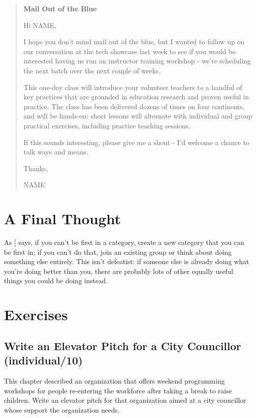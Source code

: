 \begin{quote}\setlength{\parindent}{0pt}
\textbf{Mail Out of the Blue}

Hi NAME,

I hope you don't mind mail out of the blue, but I wanted to follow up
on our conversation at the tech showcase last week to see if you would
be interested having us run an instructor training workshop - we're
scheduling the next batch over the next couple of weeks.

This one-day class will introduce your volunteer teachers to a handful
of key practices that are grounded in education research and proven
useful in practice. The class has been delivered dozens of times on
four continents, and will be hands-on: short lessons will alternate
with individual and group practical exercises, including practice
teaching sessions.

If this sounds interesting, please give me a shout - I'd welcome a
chance to talk ways and means.

Thanks,

NAME
\end{quote}

\section{A Final Thought}\label{s:marketing-final}

As {[}\protect[\hyperlink{b:Kuch2011}{Kuch2011}]{]} says, if you can't be first in a category, create
a new category that you can be first in; if you can't do that, join an
existing group or think about doing something else entirely. This isn't
defeatist: if someone else is already doing what you're doing better
than you, there are probably lots of other equally useful things you
could be doing instead.

\section{Exercises}\label{s:marketing-exercises}

\subsection{Write an Elevator Pitch for a City Councillor (individual/10)}\label{write-an-elevator-pitch-for-a-city-councillor-individual10}

This chapter described an organization that offers weekend programming
workshops for people re-entering the workforce after taking a break to
raise children. Write an elevator pitch for that organization aimed at a
city councillor whose support the organization needs.

